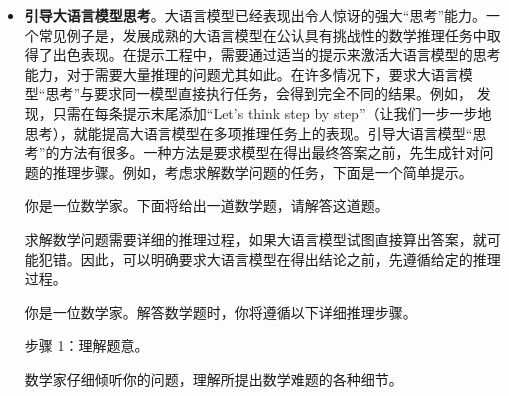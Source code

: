\begin{itemize}
\begin{tcolorbox}
    \underline{\hspace{2em}}

    \endgroup

    \end{tcolorbox}
    \vspace{0.5em}

\item \vspace{0.3em} \textbf{引导大语言模型思考}。大语言模型已经表现出令人惊讶的强大“思考”能力。一个常见例子是，发展成熟的大语言模型在公认具有挑战性的数学推理任务中取得了出色表现。在提示工程中，需要通过适当的提示来激活大语言模型的思考能力，对于需要大量推理的问题尤其如此。在许多情况下，要求大语言模型“思考”与要求同一模型直接执行任务，会得到完全不同的结果。例如，\citet{kojima-etal:2022large} 发现，只需在每条提示末尾添加“Let's think step by step”（让我们一步一步地思考），就能提高大语言模型在多项推理任务上的表现。引导大语言模型“思考”的方法有很多。一种方法是要求模型在得出最终答案之前，先生成针对问题的推理步骤。例如，考虑求解数学问题的任务，下面是一个简单提示。

    \vspace{0.5em}
    \begin{tcolorbox}

    \begingroup
    \setlength{\leftskip}{2em}
    \setlength{\rightskip}{2em}

    你是一位数学家。下面将给出一道数学题，请解答这道题。

    \underline{\hspace{2em}}

    \endgroup

    \end{tcolorbox}
    \vspace{0.5em}

    求解数学问题需要详细的推理过程，如果大语言模型试图直接算出答案，就可能犯错。因此，可以明确要求大语言模型在得出结论之前，先遵循给定的推理过程。

    \vspace{0.5em}
    \begin{tcolorbox}

    \begingroup
    \setlength{\leftskip}{2em}
    \setlength{\rightskip}{2em}

    你是一位数学家。解答数学题时，你将遵循以下详细推理步骤。

    \vspace{0.5em}

    步骤 1：理解题意。

    数学家仔细倾听你的问题，理解所提出数学难题的各种细节。


\end{tcolorbox}
\end{itemize}
